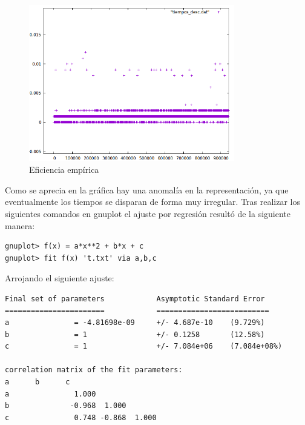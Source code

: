 \documentclass[paper=a4, fontsize=10pt]{scrartcl} %
\begin{document}
\begin{figure}[H] %
	\centering
	\label{lsblk}
	\includegraphics[width=0.8\textwidth]{../imgs/ejercicio3b.PNG}
	\caption{Eficiencia empírica} 
\end{figure}

Como se aprecia en la gráfica hay una anomalía en la representación, ya que eventualmente los tiempos se disparan de forma muy irregular.
Tras realizar los siguientes comandos en gnuplot el ajuste por regresión resultó de la siguiente manera:

\begin{lstlisting}
gnuplot> f(x) = a*x**2 + b*x + c
gnuplot> fit f(x) 't.txt' via a,b,c
\end{lstlisting}

Arrojando el siguiente ajuste:

\begin{lstlisting}
Final set of parameters            Asymptotic Standard Error
=======================            ==========================
a               = -4.81698e-09     +/- 4.687e-10    (9.729%)
b               = 1                +/- 0.1258       (12.58%)
c               = 1                +/- 7.084e+06    (7.084e+08%)

correlation matrix of the fit parameters:
a      b      c      
a               1.000 
b              -0.968  1.000 
c               0.748 -0.868  1.000 
\end{lstlisting}
\end{document}
